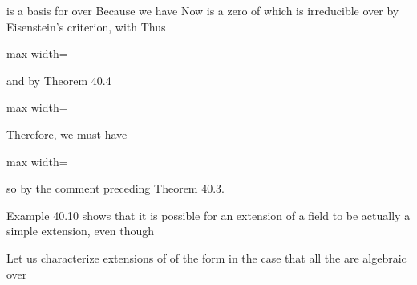 \documentclass[11pt,oneside]{article}
\begin{document}
\begin{BookBody}
\noindent is a basis for  over  Because  we have  Now  is a zero of  which is irreducible over  by Eisenstein’s criterion, with  Thus

\begin{center}\begin{adjustbox}{max width=\linewidth}\end{adjustbox}\end{center}

\noindent and by Theorem 40.4

\begin{center}\begin{adjustbox}{max width=\linewidth}\end{adjustbox}\end{center}

\noindent Therefore, we must have

\begin{center}\begin{adjustbox}{max width=\linewidth}\end{adjustbox}\end{center}

\noindent so  by the comment preceding Theorem 40.3. \BookEnd{\blacktriangle}

Example 40.10 shows that it is possible for an extension  of a field  to be actually a simple extension, even though 

Let us characterize extensions of  of the form  in the case that all the  are algebraic over 


\end{BookBody}
\end{document}
